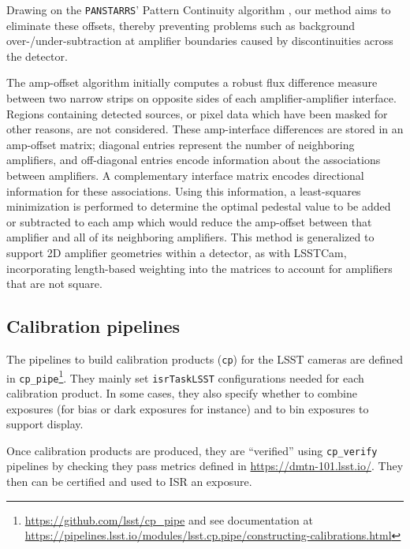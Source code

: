 Drawing on the \texttt{PANSTARRS}' Pattern Continuity algorithm \citep{2020ApJS..251....4W}, our method aims to eliminate these offsets, thereby preventing problems such as background over-/under-subtraction at amplifier boundaries caused by discontinuities across the detector.

The amp-offset algorithm initially computes a robust flux difference measure between two narrow strips on opposite sides of each amplifier-amplifier interface.
Regions containing detected sources, or pixel data which have been masked for other reasons, are not considered.
These amp-interface differences are stored in an amp-offset matrix; diagonal entries represent the number of neighboring amplifiers, and off-diagonal entries encode information about the associations between amplifiers.
A complementary interface matrix encodes directional information for these associations.
Using this information, a least-squares minimization is performed to determine the optimal pedestal value to be added or subtracted to each amp which would reduce the amp-offset between that amplifier and all of its neighboring amplifiers.
This method is generalized to support 2D amplifier geometries within a detector, as with LSSTCam, incorporating length-based weighting into the matrices to account for amplifiers that are not square.

\subsection{Calibration pipelines}
\label{sec:calib_pipe}

The pipelines to build calibration products (\texttt{cp}) for the LSST cameras are defined in \texttt{cp\_pipe}\footnote{\url{https://github.com/lsst/cp\_pipe} and see documentation at \url{https://pipelines.lsst.io/modules/lsst.cp.pipe/constructing-calibrations.html}}.
They mainly set \texttt{isrTaskLSST} configurations needed for each calibration product. In some cases, they also specify whether to combine exposures (for bias or dark exposures for instance) and to bin exposures to support display.

Once calibration products are produced, they are ``verified'' using \texttt{cp\_verify} pipelines by checking they pass metrics defined in \url{https://dmtn-101.lsst.io/}. They then can be certified and used to ISR an exposure.
